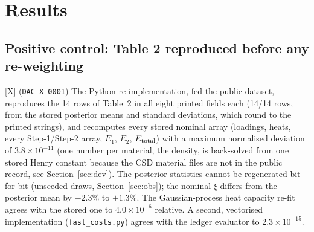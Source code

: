 \documentclass[10pt]{article}
\newcommand{\tier}[1]{\textsf{[#1]}}
\newcommand{\tX}{\tier{X}}
\newcommand{\id}[1]{\texttt{DAC-#1}}
\begin{document}
\section{Results}\label{sec:results}
\subsection{Positive control: Table 2 reproduced before any re-weighting}
\tX{} (\id{X-0001}) The Python re-implementation, fed the public dataset, reproduces the 14 rows of Table~2 in all eight printed fields each (14/14 rows, from the stored posterior means and standard deviations, which round to the printed strings), and recomputes every stored nominal array
(loadings, heats, every Step-1/Step-2 array, $E_1$, $E_2$, $E_{\rm total}$) with a maximum normalised deviation of $3.8\times10^{-11}$ (one number per material, the density, is back-solved from one stored Henry constant because the CSD material files are not in the public record, see Section~\ref{sec:dev}). The posterior statistics cannot be regenerated bit for bit (unseeded draws, Section~\ref{sec:obs}); the nominal $\xi$
differs from the posterior mean by $-2.3\%$ to $+1.3\%$. The Gaussian-process heat capacity re-fit agrees with the stored one to $4.0\times10^{-6}$ relative. A second, vectorised implementation (\texttt{fast\_costs.py}) agrees with the ledger evaluator to $2.3\times10^{-15}$.
\end{document}
